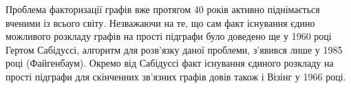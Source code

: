 Проблема факторизації графів вже протягом 40 років активно піднімається вченими із всього світу. Незважаючи на те, що сам факт існування єдино можливого розкладу графів на прості підграфи було доведено ще у 1960 році Гертом Сабідуссі, алгоритм для розв'язку даної проблеми, з'явився лише у 1985 році (Файгенбаум). Окремо від Сабідуссі факт існування єдиного розкладу на прості підграфи для скінченних зв'язних графів довів також і Візінг у 1966 році.
